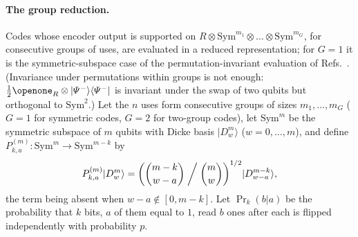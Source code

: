 \documentclass[aps,pra,twocolumn,superscriptaddress,nofootinbib,longbibliography,floatfix]{revtex4-2}
\newcommand{\ket}[1]{|#1\rangle}
\newcommand{\proj}[1]{|#1\rangle\langle #1|}
\newcommand{\sym}{\mathrm{Sym}}
\newcommand{\dk}[2]{\ket{D^{#1}_{#2}}}
\newcommand{\prk}{\operatorname{Pr}}
\begin{document}
\paragraph*{The group reduction.} Codes whose encoder output is supported on $R\otimes\sym^{m_1}\otimes\dots\otimes\sym^{m_G}$, for consecutive groups of uses, are evaluated in a reduced representation; for $G=1$ it is the symmetric-subspace case of the permutation-invariant evaluation of Refs.~\cite{parentin2026onset,bergh2026permutation}. (Invariance under permutations within groups is not enough: $\frac12\openone_R\otimes\proj{\varPsi^-}$ is invariant under the swap of two qubits but orthogonal to $\sym^2$.) Let the $n$ uses form consecutive groups of sizes $m_1,\dots,m_G$ ($G=1$ for symmetric codes, $G=2$ for two-group codes), let $\sym^m$ be the symmetric subspace of $m$ qubits with Dicke basis $\dk mw$ ($w=0,\dots,m$), and define $P^{(m)}_{k,a}\colon\sym^m\to\sym^{m-k}$ by
\begin{equation}
P^{(m)}_{k,a}\dk mw=\biggl(\binom{m-k}{w-a}\biggm/\binom mw\biggr)^{1/2}\dk{m-k}{w-a},
\end{equation}
the term being absent when $w-a\notin[0,m-k]$. Let $\prk_k(b|a)$ be the probability that $k$ bits, $a$ of them equal to $1$, read $b$ ones after each is flipped independently with probability $p$.
\end{document}
